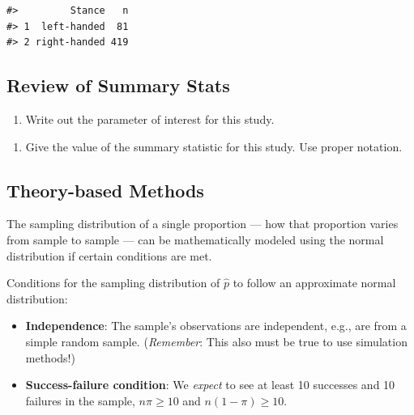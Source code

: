 \documentclass[
]{report}
\providecommand{\tightlist}{%
  \setlength{\itemsep}{0pt}\setlength{\parskip}{0pt}}
\begin{document}
\begin{verbatim}
#>         Stance   n
#> 1  left-handed  81
#> 2 right-handed 419
\end{verbatim}

\hypertarget{review-of-summary-stats}{%
\subsection{Review of Summary Stats}\label{review-of-summary-stats}}

\begin{enumerate}
\def\labelenumi{\arabic{enumi}.}
\tightlist
\item
  Write out the parameter of interest for this study.
\end{enumerate}

\vspace{0.8in}

\begin{enumerate}
\def\labelenumi{\arabic{enumi}.}
\setcounter{enumi}{1}
\tightlist
\item
  Give the value of the summary statistic for this study. Use proper notation.
\end{enumerate}

\vspace{0.3in}

\hypertarget{theory-based-methods}{%
\subsection{Theory-based Methods}\label{theory-based-methods}}

The sampling distribution of a single proportion --- how that proportion varies from sample to sample --- can be mathematically modeled using the normal distribution if certain conditions are met.

Conditions for the sampling distribution of \(\hat{p}\) to follow an approximate normal distribution:

\begin{itemize}
\item
  \textbf{Independence}: The sample's observations are independent, e.g., are from a simple random sample. (\emph{Remember}: This also must be true to use simulation methods!)
\item
  \textbf{Success-failure condition}: We \emph{expect} to see at least 10 successes and 10 failures in the sample, \(n\pi≥10\) and \(n(1-\pi)≥10\).
\end{itemize}
\end{document}
